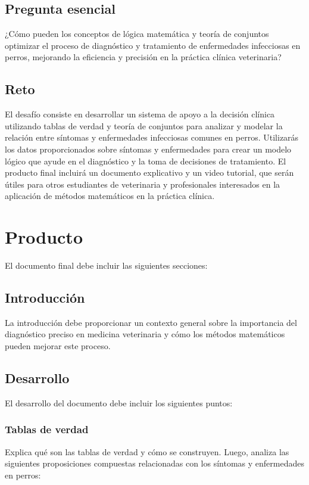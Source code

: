 \documentclass[a4,11pt]{aleph-notas}
\begin{document}
\subsection{Pregunta esencial}
¿Cómo pueden los conceptos de lógica matemática y teoría de conjuntos optimizar el proceso de diagnóstico y tratamiento de enfermedades infecciosas en perros, mejorando la eficiencia y precisión en la práctica clínica veterinaria?

\subsection{Reto}
El desafío consiste en desarrollar un sistema de apoyo a la decisión clínica utilizando tablas de verdad y teoría de conjuntos para analizar y modelar la relación entre síntomas y enfermedades infecciosas comunes en perros. Utilizarás los datos proporcionados sobre síntomas y enfermedades para crear un modelo lógico que ayude en el diagnóstico y la toma de decisiones de tratamiento. El producto final incluirá un documento explicativo y un video tutorial, que serán útiles para otros estudiantes de veterinaria y profesionales interesados en la aplicación de métodos matemáticos en la práctica clínica.

\section{Producto}
El documento final debe incluir las siguientes secciones:

\subsection{Introducción}
La introducción debe proporcionar un contexto general sobre la importancia del diagnóstico preciso en medicina veterinaria y cómo los métodos matemáticos pueden mejorar este proceso.

\subsection{Desarrollo}
El desarrollo del documento debe incluir los siguientes puntos:

\subsubsection{Tablas de verdad}
Explica qué son las tablas de verdad y cómo se construyen. Luego, analiza las siguientes proposiciones compuestas relacionadas con los síntomas y enfermedades en perros:
\end{document}
